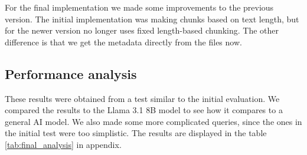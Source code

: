 \documentclass[fleqn,moreauthors,10pt]{ds_report}
\begin{document}
For the final implementation we made some improvements to the previous version. The initial implementation was making chunks based on text length, but for the newer version no longer uses fixed length-based chunking. The other difference is that we get the metadata directly from the files now.

\subsection*{Performance analysis}

These results were obtained from a test similar to the initial evaluation. We compared the results to the Llama 3.1 8B model \cite{grattafiori2024llama3herd} to see how it compares to a general AI model. We also made some more complicated queries, since the ones in the initial test were too simplistic. The results are displayed in the table \ref{tab:final_analysis} in appendix.
\end{document}
